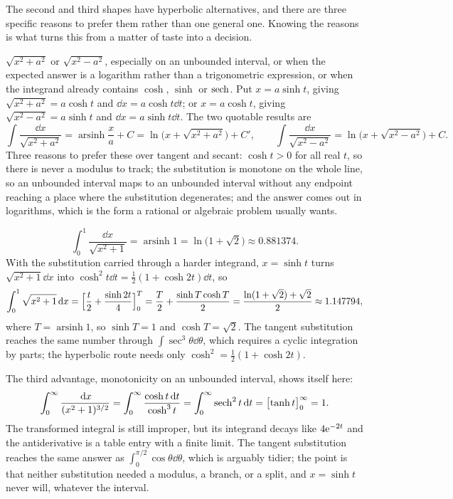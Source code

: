 The second and third shapes have hyperbolic alternatives, and there are three specific reasons to prefer them rather than one general one. Knowing the reasons is what turns this from a matter of taste into a decision.

\cue $\sqrt{x^2+a^2}$ or $\sqrt{x^2-a^2}$, especially on an unbounded interval, or when the expected answer is a logarithm rather than a trigonometric expression, or when the integrand already contains $\cosh$, $\sinh$ or $\operatorname{sech}$.
\method Put $x=a\sinh t$, giving $\sqrt{x^2+a^2}=a\cosh t$ and $\dd x=a\cosh t\dd t$; or $x=a\cosh t$, giving $\sqrt{x^2-a^2}=a\sinh t$ and $\dd x=a\sinh t\dd t$. The two quotable results are
\[
\int\frac{\dd x}{\sqrt{x^2+a^2}}=\operatorname{arsinh}\frac xa+C=\ln\bigl(x+\sqrt{x^2+a^2}\bigr)+C',
\qquad
\int\frac{\dd x}{\sqrt{x^2-a^2}}=\ln\bigl(x+\sqrt{x^2-a^2}\bigr)+C .
\]
Three reasons to prefer these over tangent and secant: $\cosh t>0$ for all real $t$, so there is never a modulus to track; the substitution is monotone on the whole line, so an unbounded interval maps to an unbounded interval without any endpoint reaching a place where the substitution degenerates; and the answer comes out in logarithms, which is the form a rational or algebraic problem usually wants.

\begin{worked}
\[
\int_0^1\frac{\dd x}{\sqrt{x^2+1}}=\operatorname{arsinh}1=\ln\bigl(1+\sqrt2\bigr)\approx0.881374 .
\]
With the substitution carried through a harder integrand, $x=\sinh t$ turns $\sqrt{x^2+1}\dd x$ into $\cosh^2t\dd t=\tfrac12(1+\cosh2t)\dd t$, so
\[
\int_0^1\sqrt{x^2+1}\,\mathrm{d} x=\Bigl[\frac{t}{2}+\frac{\sinh2t}{4}\Bigr]_0^{T}=\frac{T}{2}+\frac{\sinh T\cosh T}{2}
=\frac{\ln(1+\sqrt2)+\sqrt2}{2}\approx1.147794 ,
\]
where $T=\operatorname{arsinh}1$, so $\sinh T=1$ and $\cosh T=\sqrt2$. The tangent substitution reaches the same number through $\int\sec^3\theta\dd\theta$, which requires a cyclic integration by parts; the hyperbolic route needs only $\cosh^2=\tfrac12(1+\cosh2t)$.

The third advantage, monotonicity on an unbounded interval, shows itself here:
\[
\int_0^{\infty}\frac{\,\mathrm{d} x}{(x^2+1)^{3/2}}=\int_0^{\infty}\frac{\cosh t\,\mathrm{d} t}{\cosh^3t}=\int_0^{\infty}\operatorname{sech}^2t\,\mathrm{d} t=\bigl[\tanh t\bigr]_0^{\infty}=1 .
\]
The transformed integral is still improper, but its integrand decays like $4\mathrm{e}^{-2t}$ and the antiderivative is a table entry with a finite limit. The tangent substitution reaches the same answer as $\int_0^{\pi/2}\cos\theta\dd\theta$, which is arguably tidier; the point is that neither substitution needed a modulus, a branch, or a split, and $x=\sinh t$ never will, whatever the interval.
\end{worked}

